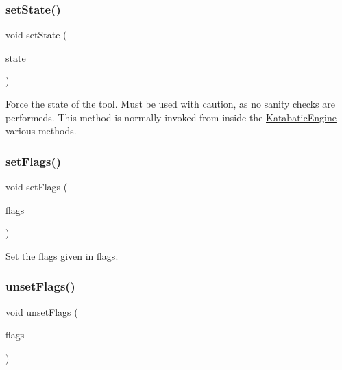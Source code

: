 \subsubsection{\texorpdfstring{set\+State()}{setState()}}
{\footnotesize\ttfamily void set\+State (\begin{DoxyParamCaption}\item[{\hyperlink{namespaceKatabatic_ab9e409db5feff0bdbc85e90e2a029cda}{Engine\+State}}]{state }\end{DoxyParamCaption})\hspace{0.3cm}{\ttfamily [inline]}}

Force the state of the tool. Must be used with caution, as no sanity checks are performeds. This method is normally invoked from inside the \hyperlink{classKatabatic_1_1KatabaticEngine}{Katabatic\+Engine} various methods. \mbox{\label{classKatabatic_1_1KatabaticEngine_aeb14f94914af58657a0dc2f50ec98df5}} 
\subsubsection{\texorpdfstring{set\+Flags()}{setFlags()}}
{\footnotesize\ttfamily void set\+Flags (\begin{DoxyParamCaption}\item[{unsigned int}]{flags }\end{DoxyParamCaption})\hspace{0.3cm}{\ttfamily [inline]}}

Set the flags given in {\ttfamily flags}. \mbox{\label{classKatabatic_1_1KatabaticEngine_a1a6fac115cb81db48e3ac9ffa0721bb5}} 
\subsubsection{\texorpdfstring{unset\+Flags()}{unsetFlags()}}
{\footnotesize\ttfamily void unset\+Flags (\begin{DoxyParamCaption}\item[{unsigned int}]{flags }\end{DoxyParamCaption})\hspace{0.3cm}{\ttfamily [inline]}}

